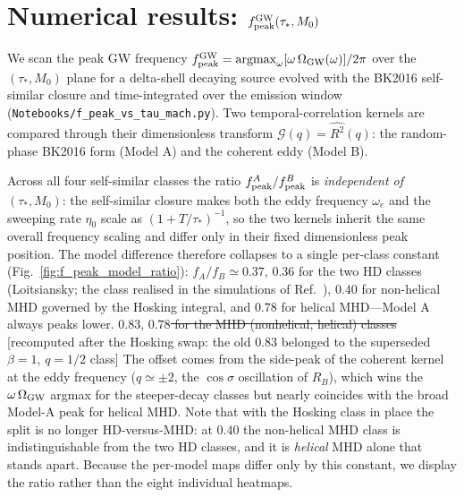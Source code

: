 \documentclass[10pt,prd,aps,nobibnotes,superscriptaddress,preprintnumbers,notitlepage]{revtex4-1}
\newcommand{\add}[1]{{\color{red}#1}}
\newcommand{\del}[1]{{\color{red}\sout{#1}}}
\newcommand{\why}[1]{{\color{red}\footnotesize\textsf{[#1]}}}
\newcommand{\add}[1]{#1}
\newcommand{\del}[1]{}
\newcommand{\why}[1]{}
\begin{document}
\section{\texorpdfstring{Numerical results: $f_{\rm peak}^{\rm GW}(\tau_\ast, M_0)$}{Numerical results: f\_peak\^GW(tau, M0)}}
\label{sec:fpeak-numerical}

We scan the peak GW frequency
$f_{\rm peak}^{\rm GW}=\operatorname{argmax}_\omega[\omega\,\Omega_{\rm GW}(\omega)]/2\pi$
over the $(\tau_\ast,M_0)$ plane for a delta-shell decaying source evolved with
the BK2016 self-similar closure and time-integrated over the emission window
(\texttt{Notebooks/f\_peak\_vs\_tau\_mach.py}). Two temporal-correlation kernels
are compared through their dimensionless transform
$\mathcal{G}(q)=\widehat{R^2}(q)$: the random-phase BK2016 form (Model A) and the
coherent eddy (Model B).

Across all four self-similar classes the ratio
$f_{\rm peak}^{A}/f_{\rm peak}^{B}$ is \emph{independent of} $(\tau_\ast,M_0)$:
the self-similar closure makes both the eddy frequency $\omega_e$ and the
sweeping rate $\eta_0$ scale as $(1+T/\tau_\ast)^{-1}$, so the two kernels inherit
the same overall frequency scaling and differ only in their fixed dimensionless
peak position. The model difference therefore collapses to a single per-class
constant (Fig.~\ref{fig:f_peak_model_ratio}): \add{$f_A/f_B\simeq0.37,\,0.36$ for the
two HD classes (Loitsiansky; the class realised in the simulations of
Ref.~\cite{Brandenburg:2016odr}), $0.40$ for non-helical MHD governed by the Hosking
integral, and $0.78$ for helical MHD}---Model A always peaks lower.
\del{$0.83,\,0.78$ for the MHD (nonhelical, helical) classes}
\why{recomputed after the Hosking swap: the old $0.83$ belonged to the superseded
$\beta=1$, $q=1/2$ class}
\add{The offset comes from the side-peak of the coherent kernel at the eddy frequency
($q\simeq\pm2$, the $\cos\sigma$ oscillation of $R_B$), which wins the
$\omega\,\Omega_{\rm GW}$ argmax for the steeper-decay classes but nearly coincides with
the broad Model-A peak for helical MHD. Note that with the Hosking class in place the
split is no longer HD-versus-MHD: at $0.40$ the non-helical MHD class is
indistinguishable from the two HD classes, and it is \emph{helical} MHD alone that
stands apart.} Because the per-model maps differ only by this constant, we
display the ratio rather than the eight individual heatmaps.
\end{document}

